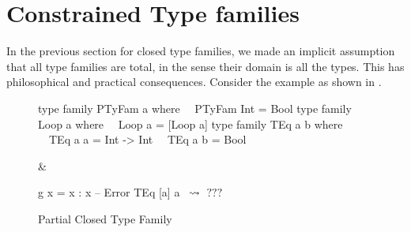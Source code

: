 \documentclass[format=acmsmall,manuscript,screen,nonacm,margin=1in,11pt]{acmart}
\begin{document}
\newcommand\SApp{
  \ib{\irule[\trule{s-app}]
    {\stepsto {\Tm_1} {\Tm'_1}};
    {\stepsto {\Tm_1\App\Tm_2} {\Tm'_1\App\Tm_2}}}
}
\newcommand\STApp{
  \ib{\irule[\trule{s-tapp}]
    {\stepsto {\Tm_1} {\Tm'_1}};
    {\stepsto {\Tm_1\App\tau} {\Tm'_1\App\tau}}}
}

\newcommand\SCApp{
  \ib{\irule[\trule{s-capp}]
    {\stepsto {\Tm_1} {\Tm'_1}};
    {\stepsto {\Tm_1\App\Co} {\Tm'_1\App\Co}}}
}

\newcommand\SCast{
  \ib{\irule[\trule{s-cast}]
    {\stepsto {\Tm_1} {\Tm'_1}};
    {\stepsto {\cast{\Tm_1}\Co} {\cast{\Tm'_1}\Co}}}
}

\newcommand\SBeta{
  \ib{\irule[\trule{s-$\beta$}];
    {\stepsto {(\Lam x \Tm_1)\App\Tm_2} {\Tm_1[x/\Tm_2]}}
  }
}
\newcommand\STBeta{
  \ib{\irule[\trule{s-T$\beta$}];
    {\stepsto {(\TLam \alpha \Tm)\App\tau} {\Tm[\alpha/\tau]}}
  }
}

\newcommand\SPush{
  \ib{\irule[\trule{s-push}]
    {\Co_1 = \sym{\nth 0 \Co}}
    {\Co_2 = \nth 1 \Co};
    {\stepsto {(\cast {\Lam x \Tm} \Co) \App \Tm_1} {\cast {(\Lam x \Tm)\App(\cast{\Tm_1} {\Co_1})} {\Co_2}}}
  }
}
\newcommand\STPush{
  \ib{\irule[\trule{s-tpush}];
    {\stepsto {(\cast {\TLam \alpha \Tm} \Co) \App \tau} {\cast {(\TLam \alpha \Tm)\App\tau} {\Co@\tau}}}
  }
}
\newcommand\STrans{
  \ib{\irule[\trule{s-trans}];
    {\stepsto {\cast {(\cast \Tm \Co)} \MoreCo} {\cast \Tm {\comp\Co\MoreCo}}}
  }
  
}

\section{Constrained Type families}\label{sec:tf-constrained}
In the previous section for closed type families, we made an implicit assumption
that all type families are total, in the sense their domain is all the types.
This has philosophical and practical consequences.
Consider the example as shown in .
\begin{figure}[ht]
    \footnotesize
  \begin{tabularx}\textwidth{X X}
\begin{code}^^J
type family PTyFam a where^^J
\ \  PTyFam Int = Bool^^J
^^J
type family Loop a where^^J
\ \  Loop a = [Loop a]^^J
^^J
type family TEq a b where^^J
\ \  TEq a a = Int -> Int^^J
\ \  TEq a b = Bool^^J
\end{code}&%
\begin{code}^^J
g x = x : x -- Error^^J
^^J
TEq [a] a \ $\mathrel{\rightsquigarrow}$\ $???$^^J
\end{code}
  \end{tabularx}
  \caption{Partial Closed Type Family}
  \label{fig:partial-tyfam}
\end{figure}
\end{document}
